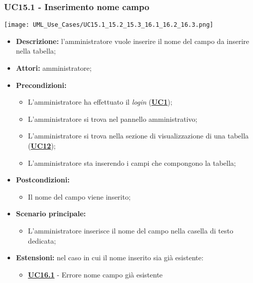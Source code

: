 \subsubsection{UC15.1 - Inserimento nome campo}
\label{sec:UC15.1}
\texttt{[image: UML\_Use\_Cases/UC15.1\_15.2\_15.3\_16.1\_16.2\_16.3.png]}
\begin{itemize}
	\item \textbf{Descrizione:} l’amministratore vuole inserire il nome del campo da inserire nella tabella;
	\item \textbf{Attori:} amministratore;
	\item \textbf{Precondizioni:} 
	\begin{itemize}
		\item L’amministratore ha effettuato il \textit{login} (\hyperref[sec:UC1]{\textbf{UC1}});
		\item L’amministratore si trova nel pannello amministrativo;
		\item L’amministratore si trova nella sezione di visualizzazione di una tabella (\hyperref[sec:UC12]{\textbf{UC12}});
		\item L’amministratore sta inserendo i campi che compongono la tabella;
	\end{itemize}
	\item \textbf{Postcondizioni:} 
	\begin{itemize}
		\item Il nome del campo viene inserito;
	\end{itemize}
	\item \textbf{Scenario principale:} 
	\begin{itemize}
		\item L’amministratore inserisce il nome del campo nella casella di testo dedicata;
	\end{itemize}
	\item \textbf{Estensioni:} nel caso in cui il nome inserito sia già esistente:
	\begin{itemize}
		\item \hyperref[sec:UC16.1]{\textbf{UC16.1}} - Errore nome campo già esistente
	\end{itemize}
\end{itemize}

